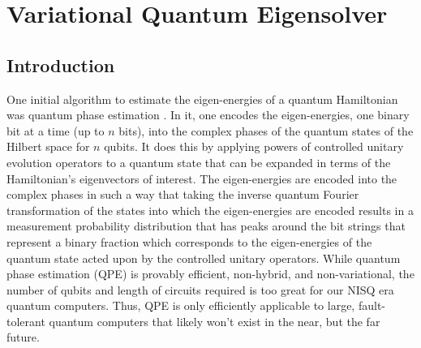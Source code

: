\documentclass[10pt]{article}
\begin{document}
\section{Variational Quantum Eigensolver}

\subsection{Introduction}

One initial algorithm to estimate the eigen-energies of a quantum Hamiltonian was quantum phase estimation \cite{ref:qpe}. In it, one encodes the eigen-energies, one binary bit at a time (up to $n$ bits), into the complex phases of the quantum states of the Hilbert space for $n$ qubits. It does this by applying powers of controlled unitary evolution operators to a quantum state that can be expanded in terms of the Hamiltonian's eigenvectors of interest. The eigen-energies are encoded into the complex phases in such a way that taking the inverse quantum Fourier transformation of the states into which the eigen-energies are encoded results in a measurement probability distribution that has peaks around the bit strings that represent a binary fraction which corresponds to the eigen-energies of the quantum state acted upon by the controlled unitary operators. While quantum phase estimation (QPE) is provably efficient, non-hybrid, and non-variational, the number of qubits and length of circuits required is too great for our NISQ era quantum computers. Thus, QPE is only efficiently applicable to large, fault-tolerant quantum computers that likely won't exist in the near, but the far future.
\end{document}
